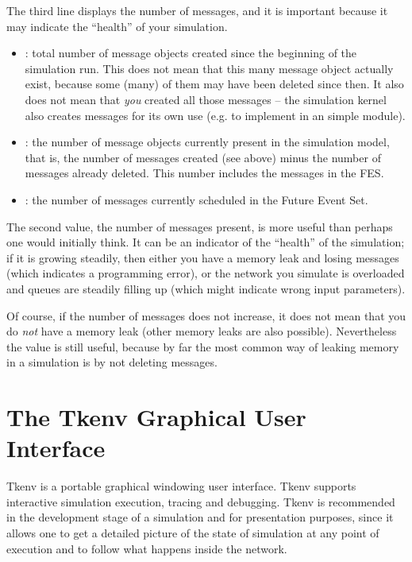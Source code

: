 The third line displays the number of messages, and it is important
because it may indicate the ``health'' of your simulation.

\begin{itemize}
   \item{: total number of message objects created since the
     beginning of the simulation run. This does not mean that this many message
     object actually exist, because some (many) of them may have been deleted
     since then. It also does not mean that \textit{you} created all those
     messages -- the simulation kernel also creates messages for its own use
     (e.g. to implement  in an  simple module).}
   \item{: the number of message objects currently present
     in the simulation model, that is, the number of messages created (see above)
     minus the number of messages already deleted. This number includes
     the messages in the FES.}
   \item{: the number of messages currently scheduled in the
     Future Event Set.}
\end{itemize}


The second value, the number of messages present, is more useful than
perhaps one would initially think. It can be an indicator of the ``health'' of the simulation;
if it is growing steadily, then either you have a memory leak and losing
messages (which indicates a programming error), or the network you simulate is
overloaded and queues are steadily filling up (which might indicate wrong input
parameters).

Of course, if the number of messages does not increase, it does not mean
that you do \textit{not} have a memory leak (other memory leaks are also
possible). Nevertheless the value is still useful, because by far the
most common way of leaking memory in a simulation is by not deleting messages.



\section{The Tkenv Graphical User Interface}
\label{sec:run-sim:tkenv}

Tkenv is a portable graphical windowing user interface.
Tkenv supports interactive simulation execution, tracing and
debugging. Tkenv is recommended in the
development stage of a simulation and for presentation purposes,
since it allows one to get a detailed picture of the state
of simulation at any point of execution and to follow what happens
inside the network.

